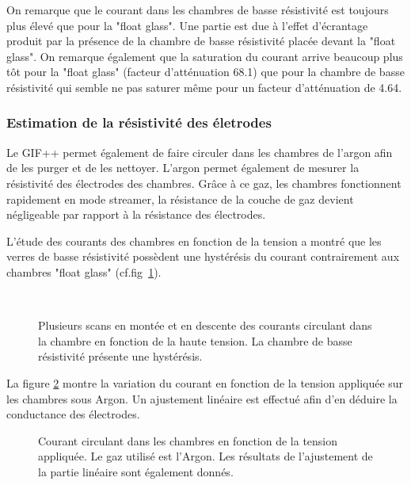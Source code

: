 On remarque que le courant dans les chambres de basse résistivité est toujours plus élevé que pour la "float glass". Une partie est due à l'effet d'écrantage produit par la présence de la chambre de basse résistivité placée devant la "float glass". On remarque également que la saturation du courant arrive beaucoup plus tôt pour la "float glass" (facteur d'atténuation 68.1) que pour la chambre de basse résistivité qui semble ne pas saturer même pour un facteur d'atténuation de \num{4.64}.

\subsubsection{Estimation de la résistivité des életrodes}

Le GIF++ permet également de faire circuler dans les chambres de l'argon afin de les purger et de les nettoyer. L'argon permet également de mesurer la résistivité des électrodes des chambres. Grâce à ce gaz, les chambres fonctionnent rapidement en mode streamer, la résistance de la couche de gaz devient négligeable  par rapport à la résistance des électrodes. 

L'étude des courants des chambres en fonction de la tension a montré que les verres de basse résistivité possèdent une hystérésis du courant contrairement aux chambres "float glass" (cf.fig~\ref{hysteresis}).


\begin{figure}[ht!]
	\centering
	\\
	\caption{Plusieurs scans en montée et en descente  des courants circulant dans la chambre en fonction de la haute tension. La chambre de basse résistivité présente une hystérésis.}
	\label{hysteresis}
\end{figure}


La figure \ref{ScanArgon} montre la variation du courant en fonction de la tension appliquée sur les chambres sous Argon. Un ajustement linéaire est effectué afin d'en déduire la conductance des électrodes.

\begin{figure}[!ht]
	\centering
	\scalebox{1.2}{}
	\caption{Courant circulant dans les chambres en fonction de la tension appliquée. Le gaz utilisé est l'Argon. Les résultats de l'ajustement de la partie linéaire sont également donnés.}
	\label{ScanArgon}
\end{figure}

